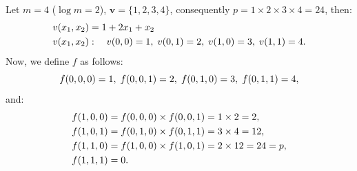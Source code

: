 \documentclass{zkdl-presentation-template}
\begin{document}
    \begin{frame}
        \begin{example}
            Let $m=4$ ($\log m=2$), $\mathbf{v} = \{1, 2, 3, 4\}$, consequently $p = 1\times2\times3\times4=24$, then:
            \vspace{-5px}
            \pause
            \begin{align*}
            v(x_1, x_2)& = 1 + 2x_1 + x_2\\
            v(x_1,x_2)&: \quad v(0,0)=1,\; v(0,1)=2,\; v(1,0)=3,\; v(1,1)=4.
            \vspace{-5px}
            \end{align*}
            \pause
            Now, we define $f$ as follows:
            \vspace{-5px}
            \begin{equation*}
                f(0,0,0)= 1,\; f(0,0,1)=2,\; f(0,1,0)=3,\; f(0,1,1)=4,
                \vspace{-5px}
            \end{equation*}
            \pause
            and:
            \vspace{-10px}
            \begin{align*}
            f(1,0,0)&= f(0,0,0) \times f(0,0,1) = 1 \times 2 = 2,\\ 
            f(1,0,1)&= f(0,1,0) \times f(0,1,1) = 3 \times 4 = 12,\\ 
            f(1,1,0)&= f(1,0,0) \times f(1,0,1) = 2 \times 12 = 24 = p,\\ 
            f(1,1,1)&= 0.
            \vspace{-5px}
            \end{align*}
        \end{example}
    \end{frame}
\end{document}

